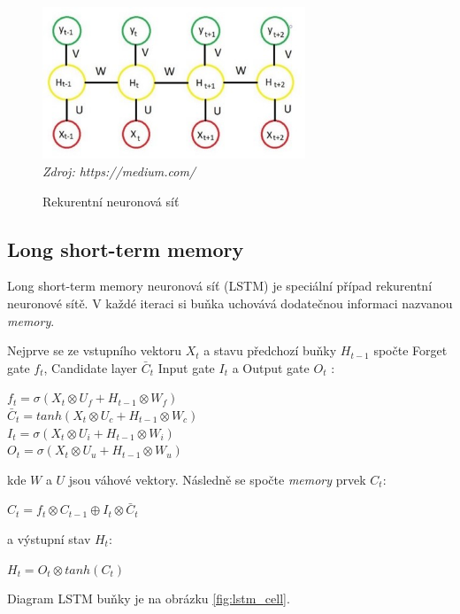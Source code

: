 \begin{figure}[H]
\caption{Rekurentní neuronová síť}
\label{fig:rnn}
\centering
\includegraphics[width=0.7\textwidth]{img/cho/rnn.jpeg}\\
\textit{Zdroj: https://medium.com/}
\end{figure}

\subsection{Long short-term memory}

Long short-term memory neuronová síť (LSTM) je speciální případ rekurentní neuronové sítě. V každé iteraci si buňka uchovává dodatečnou informaci nazvanou \textit{memory}. 

Nejprve se ze vstupního vektoru $X_{t}$ a stavu předchozí buňky $H_{t-1}$ spočte Forget gate $f_{t}$, Candidate layer $\bar{C}_{t}$ Input gate $I_{t}$ a Output gate $O_{t}$ \citep{cho.lstm}:

$f_{t}=\sigma(X_{t} \otimes U_{f}+H_{t-1} \otimes W_{f})$\\\indent
$\bar{C}_{t}=tanh(X_{t} \otimes U_{c}+H_{t-1} \otimes W_{c})$\\\indent
$I_{t}=\sigma(X_{t} \otimes U_{i}+H_{t-1} \otimes W_{i})$\\\indent
$O_{t}=\sigma(X_{t} \otimes U_{u}+H_{t-1} \otimes W_{u})$

\noindent kde $W$ a $U$ jsou váhové vektory. Následně se spočte \textit{memory} prvek $C_{t}$:

$C_{t}=f_{t} \otimes C_{t-1} \oplus I_{t} \otimes \bar{C}_{t}$

\noindent a výstupní stav $H_{t}$:

$H_{t}=O_{t} \otimes tanh(C_{t})$

Diagram LSTM buňky je na obrázku \ref{fig:lstm_cell}.

